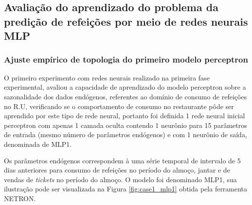     \subsection{Avaliação do aprendizado do problema da predição de refeições por meio de redes neurais MLP}
        \subsubsection{Ajuste empírico de topologia do primeiro modelo perceptron}
        
        O primeiro experimento com redes neurais realizado na primeira fase experimental, avaliou a capacidade de aprendizado do modelo perceptron sobre a sazonalidade dos dados endógenos, referentes ao domínio de consumo de refeições no R.U, verificando se o comportamento de consumo no restaurante pôde ser aprendido por este tipo de rede neural, portanto foi definida 1 rede neural inicial perceptron com apenas 1 camada oculta contendo 1 neurônio para 15 parâmetros de entrada (mesmo número de parâmetros endógenos) e com 1 neurônio de saída, denominada de MLP1.
        
        Os parâmetros endógenos correspondem à uma série temporal de intervalo de 5 dias anteriores para consumo de refeições no período do almoço, jantar e de vendas de \textit{tickets} no período do almoço.
        O modelo foi denominado MLP1, sua ilustração pode ser visualizada na Figura \ref{fig:case1_mlp1} obtida pela ferramenta NETRON. 
        
        \begin{figure}[H]
        \end{figure}
        
